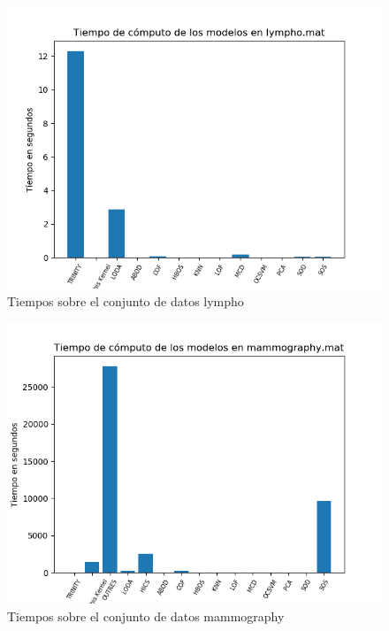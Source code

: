 \begin{figure}[H]
	\centering
	\label{lympho_times}
	\includegraphics[scale=0.7]{imagenes/imgs-exp1/times/lympho}
	\caption{Tiempos sobre el conjunto de datos lympho}
\end{figure}

\begin{figure}[H]
	\centering
	\label{mammography_times}
	\includegraphics[scale=0.7]{imagenes/imgs-exp1/times/mammography}
	\caption{Tiempos sobre el conjunto de datos mammography}
\end{figure}

